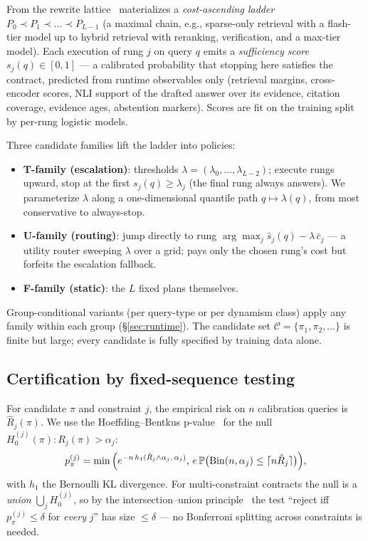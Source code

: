 From the rewrite lattice \system\ materializes a \emph{cost-ascending
ladder} $P_0 \prec P_1 \prec \dots \prec P_{L-1}$ (a maximal chain, e.g.,
sparse-only retrieval with a flash-tier model up to hybrid retrieval with
reranking, verification, and a max-tier model). Each execution of rung $j$
on query $q$ emits a \emph{sufficiency score} $s_j(q) \in [0,1]$ ---
a calibrated probability that stopping here satisfies the contract,
predicted from runtime observables only (retrieval margins, cross-encoder
scores, NLI support of the drafted answer over its evidence, citation
coverage, evidence ages, abstention markers). Scores are fit on the
training split by per-rung logistic models.

Three candidate families lift the ladder into policies:
\begin{itemize}
\item \textbf{T-family (escalation)}: thresholds
$\lambda = (\lambda_0, \dots, \lambda_{L-2})$; execute rungs upward, stop at
the first $s_j(q) \ge \lambda_j$ (the final rung always answers). We
parameterize $\lambda$ along a one-dimensional quantile path
$q \mapsto \lambda(q)$, from most conservative to always-stop.
\item \textbf{U-family (routing)}: jump directly to rung
$\arg\max_j \hat{s}_j(q) - \lambda\, \bar{c}_j$ --- a utility router
sweeping $\lambda$ over a grid; pays only the chosen rung's cost but
forfeits the escalation fallback.
\item \textbf{F-family (static)}: the $L$ fixed plans themselves.
\end{itemize}
Group-conditional variants (per query-type or per dynamism class) apply any
family within each group (\S\ref{sec:runtime}). The candidate set
$\mathcal{C} = \{\pi_1, \pi_2, \dots\}$ is finite but large; every candidate
is fully specified by training data alone.

\subsection{Certification by fixed-sequence testing}
\label{sec:certification}

For candidate $\pi$ and constraint $j$, the empirical risk on $n$
calibration queries is $\hat R_j(\pi)$. We use the Hoeffding--Bentkus
p-value~\cite{bentkus2004hoeffding,angelopoulos2021ltt} for the null
$H_0^{(j)}(\pi) : R_j(\pi) > \alpha_j$:
\[
p^{(j)}_{\pi} = \min\Big( e^{-n\,h_1(\hat R_j \wedge \alpha_j,\, \alpha_j)},\,
e\,\mathbb{P}\big(\mathrm{Bin}(n, \alpha_j) \le \lceil n \hat R_j \rceil\big) \Big),
\]
with $h_1$ the Bernoulli KL divergence. For multi-constraint contracts the
null is a \emph{union} $\bigcup_j H_0^{(j)}$, so by the intersection--union
principle~\cite{berger1982iut} the test ``reject iff $p^{(j)}_\pi \le \delta$
for \emph{every} $j$'' has size $\le \delta$ --- no Bonferroni splitting
across constraints is needed.

